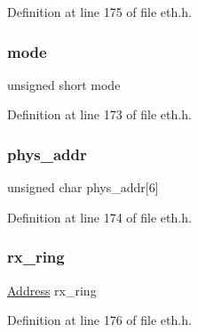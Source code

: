 Definition at line 175 of file eth.\+h.

\hypertarget{structeth__init__block_a1d1a704ce66a2b0fa1b914233418a672}{}\label{structeth__init__block_a1d1a704ce66a2b0fa1b914233418a672} 
\subsubsection{\texorpdfstring{mode}{mode}}
{\footnotesize\ttfamily unsigned short mode}



Definition at line 173 of file eth.\+h.

\hypertarget{structeth__init__block_a67e5a5231d014e64a51f257b7014031d}{}\label{structeth__init__block_a67e5a5231d014e64a51f257b7014031d} 
\subsubsection{\texorpdfstring{phys\+\_\+addr}{phys\_addr}}
{\footnotesize\ttfamily unsigned char phys\+\_\+addr\mbox{[}6\mbox{]}}



Definition at line 174 of file eth.\+h.

\hypertarget{structeth__init__block_ae3fb0d22dc23e8b5d08b2c4b7021d462}{}\label{structeth__init__block_ae3fb0d22dc23e8b5d08b2c4b7021d462} 
\subsubsection{\texorpdfstring{rx\+\_\+ring}{rx\_ring}}
{\footnotesize\ttfamily \hyperlink{tap_8h_a40606a38de2ce007717541a358bab07b}{Address} rx\+\_\+ring}



Definition at line 176 of file eth.\+h.

\hypertarget{structeth__init__block_a68a821268bfded577a82a02847941e78}{}\label{structeth__init__block_a68a821268bfded577a82a02847941e78} 
